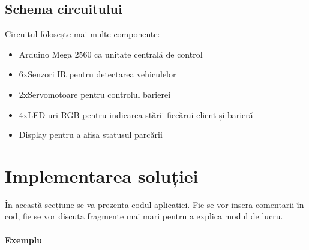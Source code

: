 \documentclass[a4paper,11pt]{report}
\begin{document}
\subsection{Schema circuitului}
Circuitul folosește mai multe componente:
\begin{itemize}
    \item Arduino Mega 2560 ca unitate centrală de control
    \item 6xSenzori IR pentru detectarea vehiculelor
    \item 2xServomotoare pentru controlul barierei
    \item 4xLED-uri RGB pentru indicarea stării fiecărui client și barieră
    \item Display pentru a afișa statusul parcării
\end{itemize}



\section{Implementarea soluției}
\label{sec:implementare}

\color{black} În această secțiune se va prezenta codul aplicației. Fie se vor insera comentarii în cod, fie se vor discuta fragmente mai mari pentru a explica modul de lucru.

\paragraph{Exemplu}
\color{black} 
\end{document}
